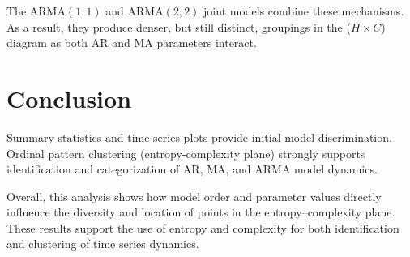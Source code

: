 \documentclass[12pt,a4paper]{article}
\begin{document}
The $\mathrm{ARMA}(1,1)$  and $\mathrm{ARMA}(2,2)$ joint models combine these mechanisms. As a result, they produce denser, but still distinct, groupings in the ($H \times C$) diagram as both AR and MA parameters interact.

\section{Conclusion}
Summary statistics and time series plots provide initial model discrimination. Ordinal pattern clustering (entropy-complexity plane) strongly supports identification and categorization of AR, MA, and ARMA model dynamics.

Overall, this analysis shows how model order and parameter values directly influence the diversity and location of points in the entropy–complexity plane. These results support the use of entropy and complexity for both identification and clustering of time series dynamics.



	
%	
	
\end{document}
